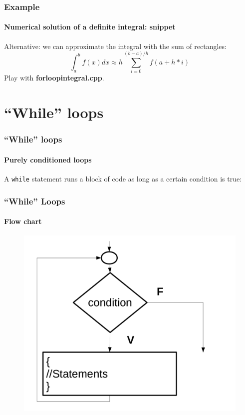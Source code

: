 \documentclass[12pt]{beamer}
\begin{document}
\begin{frame}
  \frametitle{Example}
  \framesubtitle{Numerical solution of a definite integral: snippet}
\small
Alternative: we can approximate the integral with the sum of rectangles:
  \begin{equation*}
        \int_a^b f(x) dx \approx h\sum_{i=0}^{(b-a)/h} f(a+h*i)
  \end{equation*}
\LstRectangle
Play with \textbf{forloopintegral.cpp}. %
\end{frame}

\section{``While'' loops}

\begin{frame}
  \frametitle{``While'' loops}
  \framesubtitle{Purely conditioned loops}
	A \lstinline/while/ statement runs a block of code as long as a certain
	condition is true:
	\LstWhile
\end{frame}


\begin{frame}
\frametitle{``While'' Loops}
\framesubtitle{Flow chart}
\LstWhileLine
\begin{figure}
    \includegraphics[height=0.7\textheight]{../figures/while_loop}
\end{figure}
\end{frame}
\end{document}
